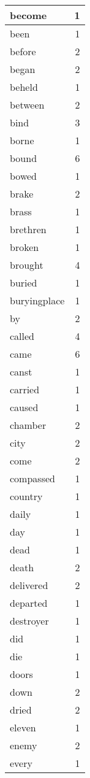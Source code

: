 \begin{center}
\begin{longtable}{l|r}
become & 1\\ \hline 
been & 1\\ \hline 
before & 2\\ \hline 
began & 2\\ \hline 
beheld & 1\\ \hline 
between & 2\\ \hline 
bind & 3\\ \hline 
borne & 1\\ \hline 
bound & 6\\ \hline 
bowed & 1\\ \hline 
brake & 2\\ \hline 
brass & 1\\ \hline 
brethren & 1\\ \hline 
broken & 1\\ \hline 
brought & 4\\ \hline 
buried & 1\\ \hline 
buryingplace & 1\\ \hline 
by & 2\\ \hline 
called & 4\\ \hline 
came & 6\\ \hline 
canst & 1\\ \hline 
carried & 1\\ \hline 
caused & 1\\ \hline 
chamber & 2\\ \hline 
city & 2\\ \hline 
come & 2\\ \hline 
compassed & 1\\ \hline 
country & 1\\ \hline 
daily & 1\\ \hline 
day & 1\\ \hline 
dead & 1\\ \hline 
death & 2\\ \hline 
delivered & 2\\ \hline 
departed & 1\\ \hline 
destroyer & 1\\ \hline 
did & 1\\ \hline 
die & 1\\ \hline 
doors & 1\\ \hline 
down & 2\\ \hline 
dried & 2\\ \hline 
eleven & 1\\ \hline 
enemy & 2\\ \hline 
every & 1\\ \hline 

\end{longtable}
\end{center}
